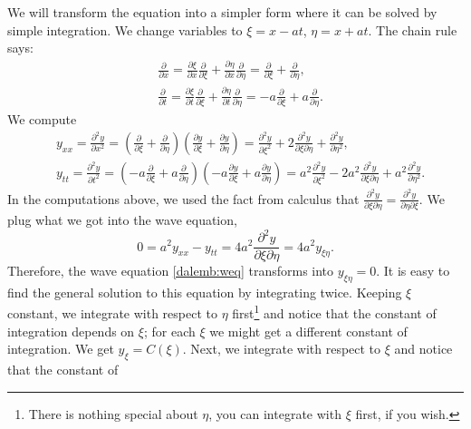 We will transform the equation into a simpler form where it can be solved by
simple integration.
We change variables to $\xi = x - at$, $\eta = x + at$.
The chain rule says:
\begin{align*}
& \frac{\partial}{\partial x}
=
\frac{\partial \xi}{\partial x}
\frac{\partial}{\partial \xi}
+
\frac{\partial \eta}{\partial x}
\frac{\partial}{\partial \eta}
=
\frac{\partial}{\partial \xi}
+
\frac{\partial}{\partial \eta} , \\
& \frac{\partial}{\partial t}
=
\frac{\partial \xi}{\partial t}
\frac{\partial}{\partial \xi}
+
\frac{\partial \eta}{\partial t}
\frac{\partial}{\partial \eta}
=
-a
\frac{\partial}{\partial \xi}
+
a
\frac{\partial}{\partial \eta} .
\end{align*}
We compute
\begin{align*}
& y_{xx} = \frac{\partial^2 y}{\partial x^2}
=
\left(
\frac{\partial}{\partial \xi}
+
\frac{\partial}{\partial \eta}
\right)
\left(
\frac{\partial y}{\partial \xi}
+
\frac{\partial y}{\partial \eta}
\right)
=
\frac{\partial^2 y}{\partial \xi^2}
+
2 \frac{\partial^2 y}{\partial \xi \partial \eta}
+
\frac{\partial^2 y}{\partial \eta^2} ,
\\
& y_{tt} = \frac{\partial^2 y}{\partial t^2}
=
\left(
-a
\frac{\partial}{\partial \xi}
+ a
\frac{\partial}{\partial \eta}
\right)
\left(
-a
\frac{\partial y}{\partial \xi}
+
a
\frac{\partial y}{\partial \eta}
\right)
=
a^2
\frac{\partial^2 y}{\partial \xi^2}
-
2 a^2 \frac{\partial^2 y}{\partial \xi \partial \eta}
+
a^2
\frac{\partial^2 y}{\partial \eta^2} .
\end{align*}
In the computations above, we used the fact from calculus that
$\frac{\partial^2 y}{\partial \xi \partial \eta} = 
\frac{\partial^2 y}{\partial \eta \partial \xi}$.
We plug what we got into the wave equation,
\begin{equation*}
0 = a^2 y_{xx} - y_{tt} =
4 a^2 \frac{\partial^2 y}{\partial \xi \partial \eta} = 4 a^2 y_{\xi\eta} .
\end{equation*}
Therefore, the wave equation \eqref{dalemb:weq} transforms into
$y_{\xi\eta} = 0$.
It is easy to find the general solution to this equation by integrating
twice.  Keeping $\xi$ constant, we integrate with respect to $\eta$
first\footnote{There is nothing special about $\eta$, you can integrate with
$\xi$ first, if you wish.}
and notice that
the constant of integration depends on $\xi$; for each $\xi$ we might get a
different constant of integration.  We get
$y_{\xi} = C(\xi)$.
Next, we integrate with respect to $\xi$ and notice that the constant of

